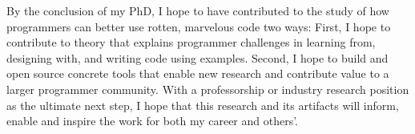 \documentclass[12pt]{memoir}
\begin{document}
By the conclusion of my PhD, I hope to have contributed to the study of how programmers can better use rotten, marvelous code two ways:
First, I hope to contribute to theory that explains programmer challenges in learning from, designing with, and writing code using examples.
Second, I hope to build and open source concrete tools that enable new research and contribute value to a larger programmer community.
With a professorship or industry research position as the ultimate next step, I hope that this research and its artifacts will inform, enable and inspire the work for both my career and others'.

\printbibliography[heading=none]
\end{document}
